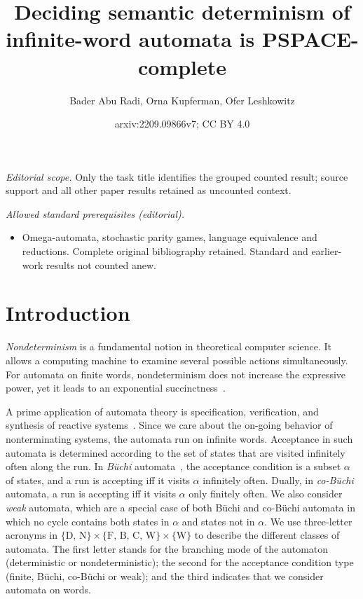 \documentclass[10pt,a4paper]{amsart}
\title{Deciding semantic determinism of infinite-word automata is PSPACE-complete}
\author{Bader Abu Radi, Orna Kupferman, Ofer Leshkowitz}
\date{arxiv:2209.09866v7; CC BY 4.0}
\theoremstyle{definition}
\numberwithin{equation}{section}
\newcommand{\buchi}{B\"uchi\xspace}
\begin{document}
\maketitle
\noindent\textit{Editorial scope.} Only the task title identifies the grouped counted result; source support and all other paper results retained as uncounted context.\par\medskip
\noindent\textit{Allowed standard prerequisites (editorial).}\begin{itemize}
\item Omega-automata, stochastic parity games, language equivalence and reductions. Complete original bibliography retained. Standard and earlier-work results not counted anew.
\end{itemize}\medskip
\section{Introduction}
\label{intro}
{\em Nondeterminism\/} is a fundamental notion in theoretical computer science. It allows a computing machine to examine several possible actions simultaneously. 
For automata on finite words, nondeterminism does not increase the expressive power, yet it leads to an exponential succinctness~\cite{RS59}. 

A prime application of automata theory is specification, verification, and synthesis of reactive systems~\cite{VW94,Kup18}.  Since we care about the on-going behavior of nonterminating  systems, the automata run on infinite words. Acceptance in such automata is determined according to the set of states that are visited infinitely often along the run. In {\em B\"uchi\/} automata~\cite{Buc62},
the acceptance condition is a subset $\alpha$ of states, and a run is accepting iff it visits $\alpha$ infinitely often. Dually, in {\em co-B\"uchi\/} automata, 
a run is accepting iff it visits $\alpha$ only finitely often. We also consider {\em weak\/} automata, which are a special case of both \buchi and co-\buchi automata in which no cycle contains both states in $\alpha$ and states not in $\alpha$. We use three-letter acronyms in $\{ \text{D, N} \} \times \{ \text{F, B, C, W}\} \times \{\text{W}\}$ to describe the different classes of automata. The first letter stands for the branching mode of the automaton (deterministic or nondeterministic); the second for the acceptance condition type (finite, \buchi, co-\buchi or weak); and the third indicates that we consider automata on words. 
\end{document}
